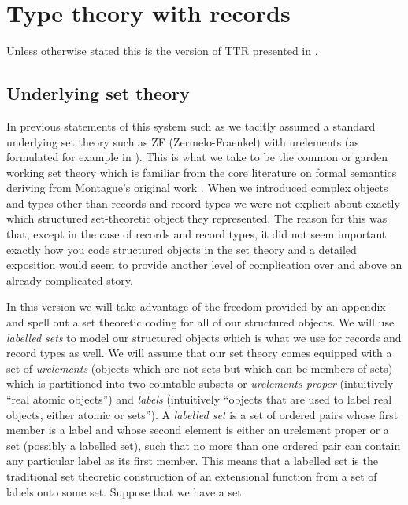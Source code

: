 \chapter{Type theory with records}
\label{app:ttr}

Unless otherwise stated this is the version of TTR presented in 
\cite{Cooper2012}.

\section{Underlying set theory}
\label{app:sets}
In previous statements of this system such as \cite{Cooper2012} we
tacitly assumed a standard underlying set theory such as ZF
(Zermelo-Fraenkel) with urelements (as formulated for example in \citealp{Suppes1960}).  This is what we take to be the
common or garden working set theory which is familiar from the core
literature on formal semantics deriving from Montague's original work
\citep{Montague1974}.  When we introduced complex
objects and types
other than records and record types we were not explicit about exactly which
structured set-theoretic object they represented.  The reason for this
was that, except in the case of records and record types, it did not
seem important exactly how you code structured objects in the set
theory and a detailed exposition would seem to provide another level
of complication over and above an already complicated story.  

In this
version we will take advantage of the freedom provided by an appendix
and spell out a set theoretic coding for all of our structured
objects.  We will use \textit{labelled sets} to model our structured
objects which is what we use for records and record types as well.  We
will assume that our set theory comes equipped with a set of
\textit{urelements} (objects which are not sets but which can be
members of sets) which is partitioned into two countable subsets or
\textit{urelements proper} (intuitively ``real atomic objects'') and
\textit{labels} (intuitively ``objects that are used to label real
objects, either atomic or sets'').  A \textit{labelled set} is a set
of ordered pairs whose first member is a label and whose second
element is either an urelement proper or a set (possibly a labelled
set), such that no more than one ordered pair can contain any
particular label as its first member.  This means that a labelled set
is the traditional set theoretic construction of an extensional
function from a set of labels onto some set.  Suppose that we have a
set

